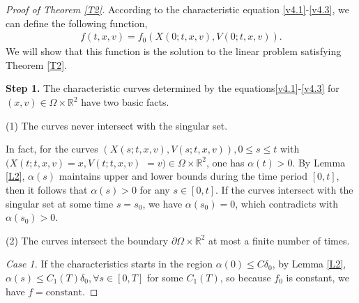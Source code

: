 \documentclass[11pt,reqno]{amsart}%
\theoremstyle{definition}
\theoremstyle{remark}
\begin{document}
\begin{proof}[Proof of Theorem \ref{T2}]
According to the characteristic equation \eqref{v4.1}-\eqref{v4.3},   we can define the following function,
\begin{align}
f(t,x,v)=f_{0}(X(0;t,x,v),V(0;t,x,v)).\label{v4.13}
\end{align}
We will show that this function is the solution to the linear problem satisfying Theorem \ref{T2}.

{\bf Step 1.} The characteristic curves determined by the  equations\eqref{v4.1}-\eqref{v4.3} for $(x,v)\in \Omega \times \mathbb{R}^{2}$  have two basic facts.
\smallskip

\noindent (1) The curves never intersect with the singular set.
  
  In fact, for the curves $(X(s;t,x,v),V(s;t,x,v)), 0\leq s\leq t$ with $(X(t;t,x,v)=x,V(t;t,x,v)$ $=v)\in \Omega \times \mathbb{R}^{2} $, one has 
  $\alpha(t)>0$. By Lemma \ref{L2}, $\alpha (s)$ maintains upper and lower bounds during the time period $[0, t]$, then it follows that $\alpha (s)> 0$ for any $s\in[0,t]$. 
  If the curves intersect with the singular set at some time  $s=s_{0}$, we have $\alpha(s_{0})=0$, which  contradicts with $\alpha (s_{0})> 0$.
  
  \smallskip
  
\noindent (2)  The curves intersect the boundary $\partial\Omega\times \mathbb{R}^{2}$ at most a finite number of times.
  
  {\em Case 1.} If the characteristics starts in the region $\alpha(0)\leq C\delta_{0}$,  by Lemma \ref{L2}, $\alpha (s)\leq C_{1}(T)\delta_{0}, \forall s\in [0,T]$ for some $C_{1}(T)$,  so because  $f_{0}$ is constant, we have $f= \text{constant}$.
  

\end{proof}
\end{document}

